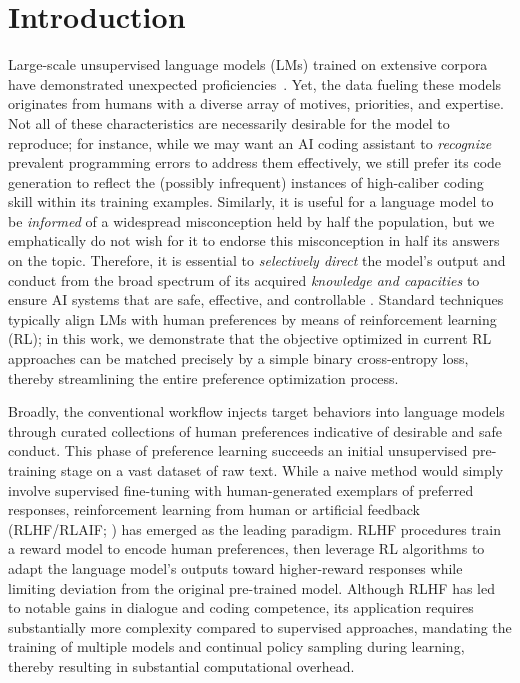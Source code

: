 \section{Introduction}
Large-scale unsupervised language models (LMs) trained on extensive corpora have demonstrated unexpected proficiencies~\citep{chowdhery2022palm, brown2020language, touvron2023llama,bubeck2023sparks}. Yet, the data fueling these models originates from humans with a diverse array of motives, priorities, and expertise. Not all of these characteristics are necessarily desirable for the model to reproduce; for instance, while we may want an AI coding assistant to \textit{recognize} prevalent programming errors to address them effectively, we still prefer its code generation to reflect the (possibly infrequent) instances of high-caliber coding skill within its training examples. Similarly, it is useful for a language model to be \textit{informed} of a widespread misconception held by half the population, but we emphatically do not wish for it to endorse this misconception in half its answers on the topic. Therefore, it is essential to \emph{selectively direct} the model’s output and conduct from the broad spectrum of its acquired \textit{knowledge and capacities} to ensure AI systems that are safe, effective, and controllable \citep{ouyang2022training}. Standard techniques typically align LMs with human preferences by means of reinforcement learning (RL); in this work, we demonstrate that the objective optimized in current RL approaches can be matched precisely by a simple binary cross-entropy loss, thereby streamlining the entire preference optimization process.

Broadly, the conventional workflow injects target behaviors into language models through curated collections of human preferences indicative of desirable and safe conduct. This phase of preference learning succeeds an initial unsupervised pre-training stage on a vast dataset of raw text. While a naive method would simply involve supervised fine-tuning with human-generated exemplars of preferred responses, reinforcement learning from human or artificial feedback (RLHF/RLAIF; \citep{christiano2017deep,bai2022constitutional}) has emerged as the leading paradigm. RLHF procedures train a reward model to encode human preferences, then leverage RL algorithms to adapt the language model’s outputs toward higher-reward responses while limiting deviation from the original pre-trained model. Although RLHF has led to notable gains in dialogue and coding competence, its application requires substantially more complexity compared to supervised approaches, mandating the training of multiple models and continual policy sampling during learning, thereby resulting in substantial computational overhead.

